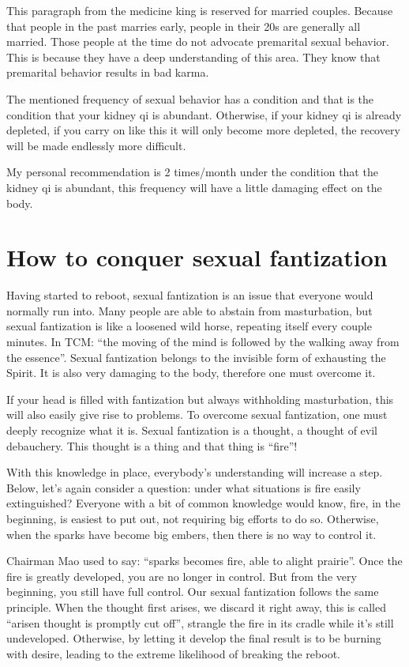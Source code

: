 \documentclass[
]{book}
\begin{document}
This paragraph from the medicine king is reserved for married couples. Because that people in the past marries early, people in their 20s are generally all married. Those people at the time do not advocate premarital sexual behavior. This is because they have a deep understanding of this area. They know that premarital behavior results in bad karma.

The mentioned frequency of sexual behavior has a condition and that is the condition that your kidney qi is abundant. Otherwise, if your kidney qi is already depleted, if you carry on like this it will only become more depleted, the recovery will be made endlessly more difficult.

My personal recommendation is 2 times/month under the condition that the kidney qi is abundant, this frequency will have a little damaging effect on the body.

\hypertarget{how-to-conquer-sexual-fantization}{%
\chapter{How to conquer sexual fantization}\label{how-to-conquer-sexual-fantization}}

Having started to reboot, sexual fantization is an issue that everyone would normally run into. Many people are able to abstain from masturbation, but sexual fantization is like a loosened wild horse, repeating itself every couple minutes. In TCM: ``the moving of the mind is followed by the walking away from the essence''. Sexual fantization belongs to the invisible form of exhausting the Spirit. It is also very damaging to the body, therefore one must overcome it.

If your head is filled with fantization but always withholding masturbation, this will also easily give rise to problems. To overcome sexual fantization, one must deeply recognize what it is. Sexual fantization is a thought, a thought of evil debauchery. This thought is a thing and that thing is ``fire''!

With this knowledge in place, everybody's understanding will increase a step. Below, let's again consider a question: under what situations is fire easily extinguished? Everyone with a bit of common knowledge would know, fire, in the beginning, is easiest to put out, not requiring big efforts to do so. Otherwise, when the sparks have become big embers, then there is no way to control it.

Chairman Mao used to say: ``sparks becomes fire, able to alight prairie''. Once the fire is greatly developed, you are no longer in control. But from the very beginning, you still have full control. Our sexual fantization follows the same principle. When the thought first arises, we discard it right away, this is called ``arisen thought is promptly cut off'', strangle the fire in its cradle while it's still undeveloped. Otherwise, by letting it develop the final result is to be burning with desire, leading to the extreme likelihood of breaking the reboot.
\end{document}
